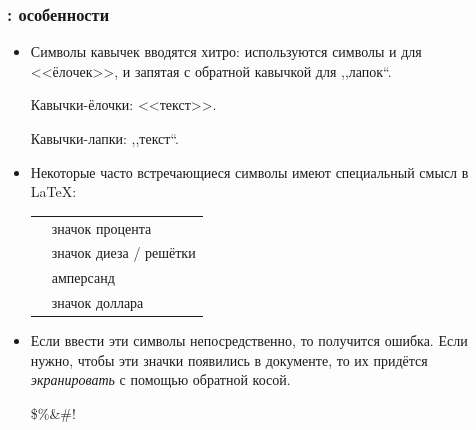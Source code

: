\documentclass{beamer}
\begin{document}
\begin{frame}[fragile]
\frametitle{\insertsubsection{}: особенности}
\vspace{-3ex}
\small
\begin{itemize}
\item Символы кавычек вводятся хитро: используются символы \keystrokebftt{<} и
  \keystrokebftt{>} для <<ёлочек>>, и запятая \keystrokebftt{,} с обратной кавычкой
   для ,,лапок``.
\begin{exampletwouptiny}
Кавычки-ёлочки: <<текст>>.

Кавычки-лапки: ,,текст``.
\end{exampletwouptiny}
\item Некоторые часто встречающиеся символы имеют специальный смысл в \LaTeX:\\
\begin{tabular}{cl}
\keystrokebftt{\%} & значок процента     \\
\keystrokebftt{\#} & значок диеза / решётки \\
\keystrokebftt{\&} & амперсанд           \\
\keystrokebftt{\$} & значок доллара      \\
\end{tabular}
\item Если ввести эти символы непосредственно, то получится ошибка. Если
  нужно, чтобы эти значки появились в документе, то их придётся \emph{экранировать}
  с помощью обратной косой.
\begin{exampletwoup}
\$\%\&\#!
\end{exampletwoup}
\end{itemize}
\end{frame}
\end{document}

